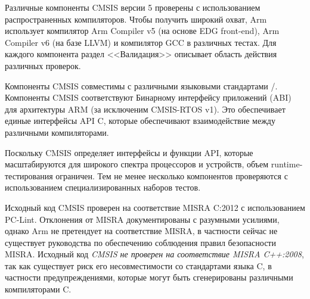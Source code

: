 \pagebreak
{}

Различные компоненты CMSIS версии 5 проверены с использованием распространенных
компиляторов. Чтобы получить широкий охват, Arm использует компилятор Arm
Compiler v5 (на основе EDG front-end), Arm Compiler v6 (на базе LLVM) и
компилятор GCC в различных тестах. Для каждого компонента раздел <<Валидация>>
описывает область действия различных проверок.

Компоненты CMSIS совместимы с различными языковыми стандартами \purec/\cpp.
Компоненты CMSIS соответствуют Бинарному интерфейсу приложений (ABI) для
архитектуры ARM (за исключеним CMSIS-RTOS v1). Это обеспечивает единые
интерфейсы API C, которые обеспечивают взаимодействие между различными
компиляторами.

Поскольку CMSIS определяет интерфейсы и функции API, которые масштабируются для
широкого спектра процессоров и устройств, объем runtime-тестирования ограничен.
Тем не менее несколько компонентов прове\-ря\-ются с использованием
специализированных наборов тестов.

Исходный код CMSIS проверен на соответствие MISRA C:2012 с использованием
PC-Lint. Отклонения от MISRA документированы с разумными усилиями, однако Arm не
претендует на соответствие MISRA, в частности сейчас не существует руководства
по обеспечению соблюдения правил безопасности MISRA. Исходный код \emph{CMSIS не
проверен на соответствие MISRA C++:2008}, так как существует риск его
несовместимости со стандартами языка C, в частности предупреждениями, которые
могут быть сгенерированы различными компиляторами C.
